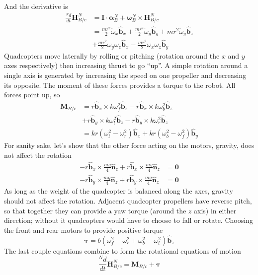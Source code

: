 \documentclass[lettersize,journal]{IEEEtran}
\begin{document}
And the derivative is
\begin{align}
	\frac{^Nd}{dt}\mathbf{H}^N_{B/c} &= \mathbf{I}\cdot\boldsymbol\alpha^N_B + \boldsymbol\omega^N_B \times \mathbf{H}^N_{B/c} \nonumber\\
	&= \frac{mr^2}{2}\dot\omega_x \mathbf{\hat{b}}_x + \frac{mr^2}{2}\dot\omega_y \mathbf{\hat{b}}_y + mr^2\dot\omega_y \mathbf{\hat{b}}_z \nonumber \\ 
	&+\frac{mr^2}{2}\omega_y \omega_z \mathbf{\hat{b}}_x - \frac{mr^2}{2} \omega_x\omega_z \mathbf{\hat{b}}_y
\end{align}
Quadcopters move laterally by rolling or pitching (rotation around the $x$ and $y$ axes respectively) then increasing thrust to go ``up''. A simple rotation around a single axis is generated by increasing the speed on one propeller and decreasing its opposite. The moment of these forces provides a torque to the robot. All forces point up, so
\begin{align}
	\mathbf{M}_{B/c} &= r \mathbf{\hat{b}}_x \times k\omega_f^2 \mathbf{\hat{b}}_z - r\mathbf{\hat{b}}_x \times k\omega_b^2 \mathbf{\hat{b}}_z \nonumber \\
	&+ r\mathbf{\hat{b}}_y\times k\omega_l^2 \mathbf{\hat{b}}_z  - r\mathbf{\hat{b}}_y \times k\omega_r^2 \mathbf{\hat{b}}_z\\
	&= kr \left(\omega_l^2-\omega_r^2\right) \mathbf{\hat{b}}_x+ kr\left(\omega_b^2-\omega_f^2\right) \mathbf{\hat{b}}_y
\end{align}
For sanity sake, let's show that the other force acting on the motors, gravity, does not affect the rotation
\begin{align}
	-r\mathbf{\hat{b}}_x \times \frac{mg}{4} \mathbf{\hat{n}}_z+r\mathbf{\hat{b}}_x \times \frac{mg}{4} \mathbf{\hat{n}}_z &= \mathbf{0} \nonumber \\
	-r\mathbf{\hat{b}}_y \times \frac{mg}{4} \mathbf{\hat{n}}_z+r\mathbf{\hat{b}}_y \times \frac{mg}{4} \mathbf{\hat{n}}_z  &= \mathbf{0} \nonumber  
\end{align}
As long as the weight of the quadcopter is balanced along the axes, gravity should not affect the rotation. Adjacent quadcopter propellers have reverse pitch, so that together they can provide a yaw torque (around the $z$ axis) in either direction; without it quadcopters would have to choose to fall or rotate. Choosing the front and rear motors to provide positive torque
\begin{equation}
	\boldsymbol\tau = b\left(\omega_f^2-\omega_r^2+\omega_b^2-\omega_l^2\right)\mathbf{\hat{b}}_z
\end{equation}
The last couple equations combine to form the rotational equations of motion
\begin{equation}
	\frac{^Nd}{dt}\mathbf{H}^N_{B/c} = \mathbf{M}_{B/c} + \boldsymbol\tau
\end{equation}
\end{document}

